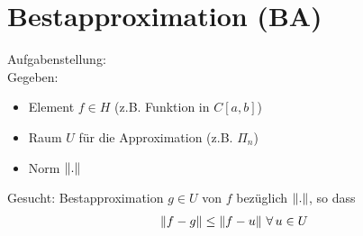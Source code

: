 \section{Bestapproximation (BA)}
Aufgabenstellung:\\
Gegeben:
\begin{itemize}
  \item Element $f \in H$ (z.B. Funktion in $C[a,b]$)
  \item Raum $U$ für die Approximation (z.B. $\Pi_n$)
  \item Norm $\left\lVert . \right\rVert$
\end{itemize}
Gesucht:
Bestapproximation $g \in U$ von $f$ bezüglich $\left\lVert . \right\rVert$, so dass 
\begin{align*}
  \left\lVert f - g \right\rVert \leq \left\lVert f - u \right\rVert\,\forall\,u \in U
\end{align*}

